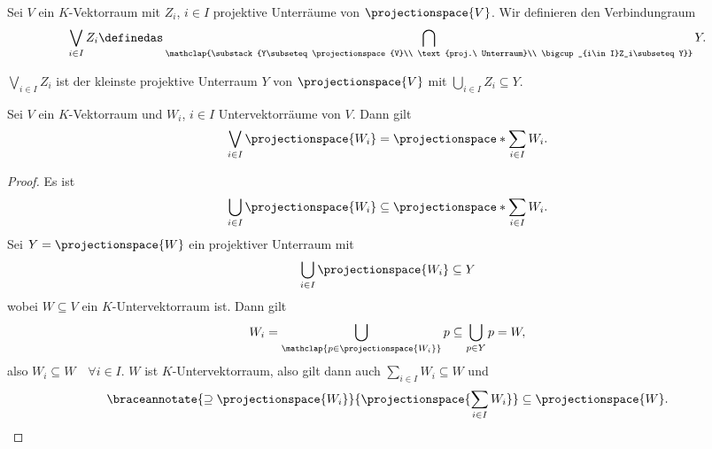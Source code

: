 \begin{definition*}
  Sei \( V \) ein \( K \)-Vektorraum mit \( Z_i \), \( i\in I \) projektive Unterräume von \( \projectionspace{V} \). Wir definieren den Verbindungraum
  \begin{equation*}
    \bigvee_{i\in I}Z_i\definedas \bigcap_{\mathclap{\substack{Y\subseteq \projectionspace{V}\\
    \text{proj.\ Unterraum}\\
    \bigcup_{i\in I}Z_i\subseteq Y}}}Y.
  \end{equation*}
\end{definition*}
\begin{bemerkung*}
  \( \bigvee_{i\in I}Z_i \) ist der kleinste projektive Unterraum \( Y \) von \( \projectionspace{V} \) mit \( \bigcup_{i\in I}Z_i\subseteq Y \).
\end{bemerkung*}
\begin{lemma}
  Sei \( V \) ein \( K \)-Vektorraum und \( W_i \), \( i\in I \) Untervektorräume von \( V \). Dann gilt
  \begin{equation*}
    \bigvee_{i\in I}\projectionspace{W_i}=\projectionspace*{\sum_{i\in I} W_i}.
  \end{equation*}
\end{lemma}
\begin{proof}
  Es ist 
  \begin{equation*}
    \bigcup_{i\in I} \projectionspace{W_i}\subseteq \projectionspace*{\sum_{i\in I}W_i}.
  \end{equation*}
  Sei \( Y=\projectionspace{W}  \) ein projektiver Unterraum mit
  \begin{equation*}
    \bigcup_{i\in I} \projectionspace{W_i}\subseteq Y
  \end{equation*}
  wobei \( W\subseteq V \) ein \( K \)-Untervektorraum ist. Dann gilt
  \begin{equation*}
    W_i=\bigcup_{\mathclap{p\in \projectionspace{W_i}}}p\subseteq \bigcup_{p\in Y}p=W,
  \end{equation*}
  also \( W_i\subseteq W \quad \forall i\in I\). \( W \) ist \( K \)-Untervektorraum, also gilt dann auch \( \sum_{i\in I}W_i\subseteq  W\) und
  \begin{equation*}
    \braceannotate{\supseteq\projectionspace{W_i}}{\projectionspace{\sum_{i\in I}W_i}}\subseteq \projectionspace{W}.
  \end{equation*}
\end{proof}